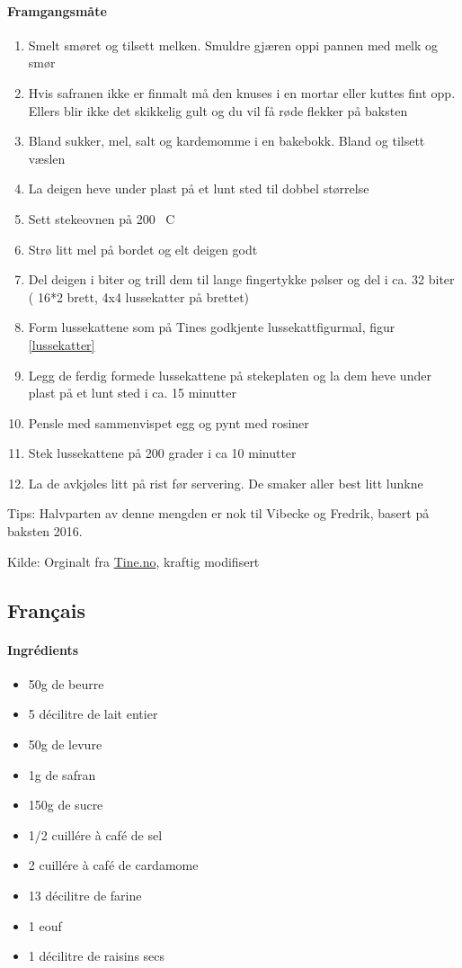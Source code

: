 \documentclass[12pt,a4paper]{book}
\begin{document}
\paragraph{Framgangsmåte}
\begin{enumerate}[noitemsep]
	\item Smelt smøret og tilsett melken. Smuldre gjæren oppi pannen med melk og smør
	\item Hvis safranen ikke er finmalt må den knuses i en mortar eller kuttes fint opp. Ellers blir ikke det skikkelig gult og du vil få røde flekker på baksten
	\item Bland sukker, mel, salt og kardemomme i en bakebokk. Bland og tilsett væslen
	\item La deigen heve under plast på et lunt sted til dobbel størrelse
	\item Sett stekeovnen på 200 \degree~C
	\item Strø litt mel på bordet og elt deigen godt
	\item Del deigen i biter og trill dem til lange fingertykke pølser og del i ca. 32 biter ( 16*2 brett, 4x4 lussekatter på brettet)
	\item Form lussekattene som på Tines godkjente lussekattfigurmal, figur  \ref{lussekatter}
	\item Legg de ferdig formede lussekattene på stekeplaten og la dem heve under plast på et lunt sted i ca. 15 minutter
	\item Pensle med sammenvispet egg og pynt med rosiner
	\item Stek lussekattene på 200 grader i  ca 10 minutter
	\item La de avkjøles litt på rist før servering. De smaker aller best litt lunkne
\end{enumerate}

Tips: Halvparten av denne mengden er nok til Vibecke og Fredrik, basert på baksten 2016.

Kilde: Orginalt fra \href{http://www.tine.no/oppskrifter/bakst/sot-gjarbakst/lussekatter}{Tine.no}, kraftig modifisert


\subsection{Français}
\paragraph{Ingrédients}
\begin{itemize}[noitemsep]
	\item 50g de beurre
	\item 5 décilitre de lait entier
	\item 50g de levure
	\item 1g de safran
	\item 150g de sucre
	\item 1/2 cuillére à café de sel
	\item 2 cuillére à café de cardamome
	\item 13 décilitre de farine
	\item 1 eouf
	\item 1 décilitre de raisins secs
\end{itemize}
\end{document}
